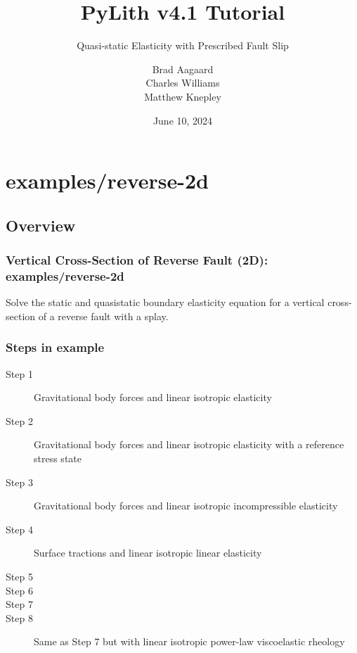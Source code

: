 \documentclass[aspectratio=169]{beamer}
\title{PyLith v4.1 Tutorial}
\subtitle{Quasi-static Elasticity with Prescribed Fault Slip}
\author{Brad Aagaard\\
  Charles Williams \\
  Matthew Knepley}
\institute{\texttt{[image: ../../logos/cig\_logo\_dots]}%
  \hspace{4em}%
\raisebox{1em}{\texttt{[image: ../../logos/cig\_short\_pylith]}}}
\date{June 10, 2024}
\begin{document}
\maketitle


\section{{\ttfamily examples/reverse-2d}}

\subsection{Overview}

\begin{frame}
  \frametitle{Vertical Cross-Section of Reverse Fault (2D): {\ttfamily examples/reverse-2d}}
  \summary{}


  \vfill
  Solve the static and quasistatic boundary elasticity equation for a vertical cross-section of a reverse fault with a splay.
  
\end{frame}


\begin{frame}
  \frametitle{Steps in example}

  \begin{description}
    \item[Step 1] Gravitational body forces and linear isotropic elasticity
    \item[Step 2] Gravitational body forces and linear isotropic elasticity with a reference stress state
    \item[Step 3] Gravitational body forces and linear isotropic incompressible elasticity
    \item[Step 4] Surface tractions and linear isotropic linear elasticity
    \item[Step 5] 
    \item[Step 6] 
    \item[Step 7] 
    \item[Step 8] Same as Step 7 but with linear isotropic power-law viscoelastic rheology
  \end{description}
  
\end{frame}
\end{document}
